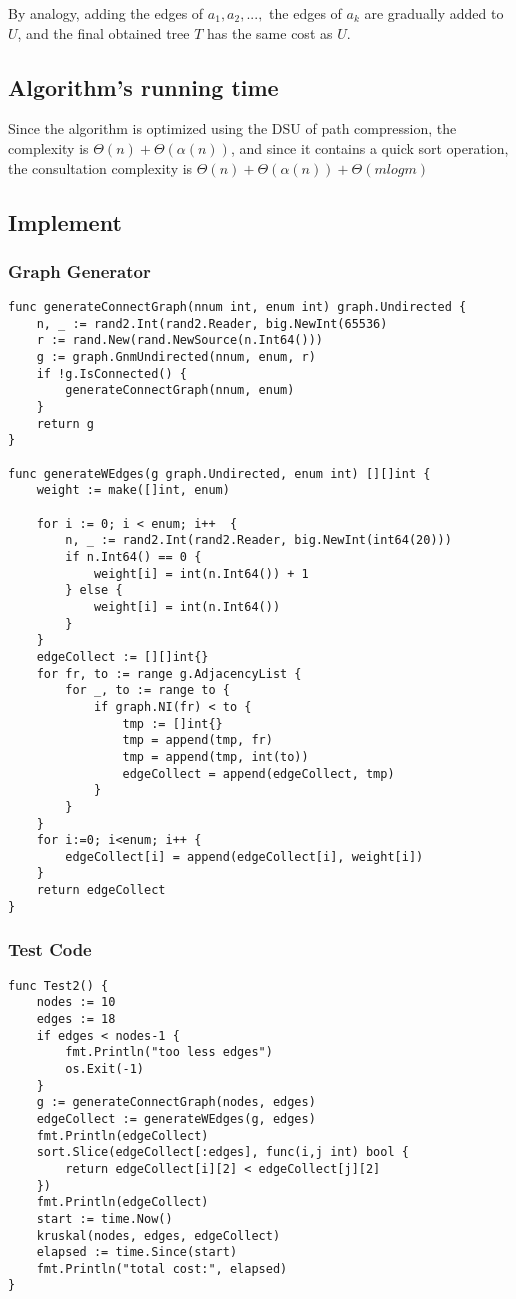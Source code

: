 \documentclass{article}
\begin{document}
By analogy, adding the edges of $a_1, a_2, ... ,$ the edges of $a_k$ are gradually added to $U$, and the final obtained tree $T$ has the same cost as $U$.

\subsection{Algorithm's running time}
Since the algorithm is optimized using the DSU of path compression, the complexity is $\Theta(n)+\Theta(\alpha(n))$, and since it contains a quick sort operation, the consultation complexity is $\Theta(n)+\Theta(\alpha(n))+\Theta(mlogm)$

\subsection{Implement}
\subsubsection{Graph Generator}
\begin{lstlisting}
func generateConnectGraph(nnum int, enum int) graph.Undirected {
    n, _ := rand2.Int(rand2.Reader, big.NewInt(65536) 
	r := rand.New(rand.NewSource(n.Int64()))
	g := graph.GnmUndirected(nnum, enum, r)
	if !g.IsConnected() {
		generateConnectGraph(nnum, enum)
	}
	return g
}

func generateWEdges(g graph.Undirected, enum int) [][]int {
	weight := make([]int, enum)

	for i := 0; i < enum; i++  {
		n, _ := rand2.Int(rand2.Reader, big.NewInt(int64(20)))
		if n.Int64() == 0 {
			weight[i] = int(n.Int64()) + 1
		} else {
			weight[i] = int(n.Int64())
		}
	}
	edgeCollect := [][]int{}
	for fr, to := range g.AdjacencyList {
		for _, to := range to {
			if graph.NI(fr) < to {
				tmp := []int{}
				tmp = append(tmp, fr)
				tmp = append(tmp, int(to))
				edgeCollect = append(edgeCollect, tmp)
			}
		}
	}
	for i:=0; i<enum; i++ {
		edgeCollect[i] = append(edgeCollect[i], weight[i])
	}
	return edgeCollect
}
\end{lstlisting}
\subsubsection{Test Code}
\begin{lstlisting}
func Test2() {
	nodes := 10
	edges := 18
	if edges < nodes-1 {
		fmt.Println("too less edges")
		os.Exit(-1)
	}
	g := generateConnectGraph(nodes, edges)
	edgeCollect := generateWEdges(g, edges)
	fmt.Println(edgeCollect)
	sort.Slice(edgeCollect[:edges], func(i,j int) bool {
		return edgeCollect[i][2] < edgeCollect[j][2]
	})
	fmt.Println(edgeCollect)
	start := time.Now()
	kruskal(nodes, edges, edgeCollect)
	elapsed := time.Since(start)
	fmt.Println("total cost:", elapsed)
}
\end{lstlisting}
\end{document}
